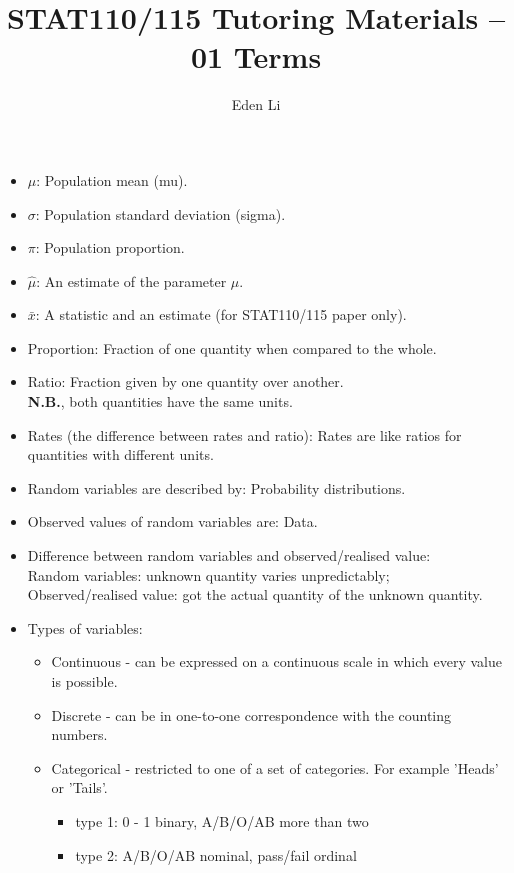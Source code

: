 \documentclass[12pt]{book}
\author{Eden Li}
\title{STAT110/115 Tutoring Materials – 01 Terms}
\date{}
\begin{document}
\pagestyle{fancy}


\begin{itemize}
\item $\mu$: Population mean (mu).
\item $\sigma$: Population standard deviation (sigma).
\item $\pi$: Population proportion.
\item $\hat{\mu}$: An estimate of the parameter $\mu$.
\item $\bar{x}$: A statistic and an estimate (for STAT110/115 paper only).
\item Proportion: Fraction of one quantity when compared to the whole.
\item Ratio: Fraction given by one quantity over another. \\
\textbf{N.B.}, both quantities have the same units.
\item Rates (the difference between rates and ratio): Rates are like ratios for quantities with different units.
\item Random variables are described by: Probability distributions.
\item Observed values of random variables are: Data.
\item Difference between random variables and observed/realised value: \\
Random variables: unknown quantity varies unpredictably; \\
Observed/realised value: got the actual quantity of the unknown quantity.
\item Types of variables: 
\begin{itemize}
\item Continuous - can be expressed on a continuous scale in which every value is possible.
\item Discrete - can be in one-to-one correspondence with the counting numbers.
\item Categorical - restricted to one of a set of categories. For example 'Heads' or 'Tails'.
\begin{itemize}
\item type 1: 0 - 1 binary, A/B/O/AB more than two
\item type 2: A/B/O/AB nominal, pass/fail ordinal
\end{itemize}
\end{itemize}

\end{itemize}
\end{document}

